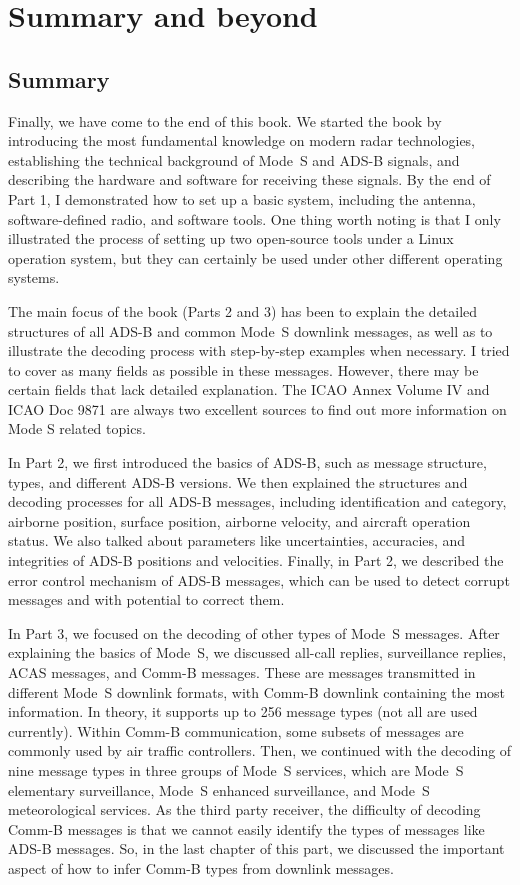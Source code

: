 \chapter{Summary and beyond}

\section{Summary}
Finally, we have come to the end of this book. We started the book by introducing the most fundamental knowledge on modern radar technologies, establishing the technical background of Mode~S and ADS-B signals, and describing the hardware and software for receiving these signals. By the end of Part 1, I demonstrated how to set up a basic system, including the antenna, software-defined radio, and software tools. One thing worth noting is that I only illustrated the process of setting up two open-source tools under a Linux operation system, but they can certainly be used under other different operating systems.

The main focus of the book (Parts 2 and 3) has been to explain the detailed structures of all ADS-B and common Mode~S downlink messages, as well as to illustrate the decoding process with step-by-step examples when necessary. I tried to cover as many fields as possible in these messages. However, there may be certain fields that lack detailed explanation. The ICAO Annex Volume IV and ICAO Doc 9871 are always two excellent sources to find out more information on Mode S related topics.

In Part 2, we first introduced the basics of ADS-B, such as message structure, types, and different ADS-B versions. We then explained the structures and decoding processes for all ADS-B messages, including identification and category, airborne position, surface position, airborne velocity, and aircraft operation status. We also talked about parameters like uncertainties, accuracies, and integrities of ADS-B positions and velocities. Finally, in Part 2, we described the error control mechanism of ADS-B messages, which can be used to detect corrupt messages and with potential to correct them.

In Part 3, we focused on the decoding of other types of Mode~S messages. After explaining the basics of Mode~S, we discussed all-call replies, surveillance replies, ACAS messages, and Comm-B messages. These are messages transmitted in different Mode~S downlink formats, with Comm-B downlink containing the most information. In theory, it supports up to 256 message types (not all are used currently). Within Comm-B communication, some subsets of messages are commonly used by air traffic controllers. Then, we continued with the decoding of nine message types in three groups of Mode~S services, which are Mode~S elementary surveillance, Mode~S enhanced surveillance, and Mode~S meteorological services. As the third party receiver, the difficulty of decoding Comm-B messages is that we cannot easily identify the types of messages like ADS-B messages. So, in the last chapter of this part, we discussed the important aspect of how to infer Comm-B types from downlink messages.


